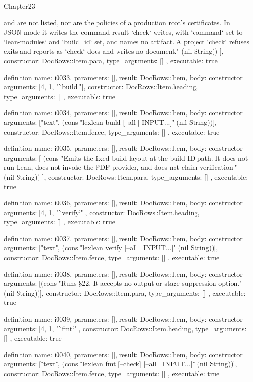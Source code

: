 \begin{lexlean}{Chapter23}
\begin{semanticmodule}
{{and are not listed, nor are the policies of a production root's certificates. In JSON mode it writes the command result `check` writes, with `command` set to `lean-modules` and `build_id` set, and names no artifact. A project `check` refuses exits and reports as `check` does and writes no document." (nil String))
    ],
    constructor: DocRows::Item.para,
    type_arguments: []
  },
  executable: true
}

definition{
  name: i0033,
  parameters: [],
  result: DocRows::Item,
  body: constructor{
    arguments: [4, 1, "`build`"],
    constructor: DocRows::Item.heading,
    type_arguments: []
  },
  executable: true
}

definition{
  name: i0034,
  parameters: [],
  result: DocRows::Item,
  body: constructor{
    arguments: ["text", (cons "lexlean build [--all | INPUT...]" (nil String))],
    constructor: DocRows::Item.fence,
    type_arguments: []
  },
  executable: true
}

definition{
  name: i0035,
  parameters: [],
  result: DocRows::Item,
  body: constructor{
    arguments: [
      (cons "Emits the fixed build layout at the build-ID path. It does not run Lean, does not invoke the PDF provider, and does not claim verification." (nil String))
    ],
    constructor: DocRows::Item.para,
    type_arguments: []
  },
  executable: true
}

definition{
  name: i0036,
  parameters: [],
  result: DocRows::Item,
  body: constructor{
    arguments: [4, 1, "`verify`"],
    constructor: DocRows::Item.heading,
    type_arguments: []
  },
  executable: true
}

definition{
  name: i0037,
  parameters: [],
  result: DocRows::Item,
  body: constructor{
    arguments: ["text", (cons "lexlean verify [--all | INPUT...]" (nil String))],
    constructor: DocRows::Item.fence,
    type_arguments: []
  },
  executable: true
}

definition{
  name: i0038,
  parameters: [],
  result: DocRows::Item,
  body: constructor{
    arguments: [(cons "Runs §22. It accepts no output or stage-suppression option." (nil String))],
    constructor: DocRows::Item.para,
    type_arguments: []
  },
  executable: true
}

definition{
  name: i0039,
  parameters: [],
  result: DocRows::Item,
  body: constructor{
    arguments: [4, 1, "`fmt`"],
    constructor: DocRows::Item.heading,
    type_arguments: []
  },
  executable: true
}

definition{
  name: i0040,
  parameters: [],
  result: DocRows::Item,
  body: constructor{
    arguments: ["text", (cons "lexlean fmt [--check] [--all | INPUT...]" (nil String))],
    constructor: DocRows::Item.fence,
    type_arguments: []
  },
  executable: true
}


\end{semanticmodule}
\end{lexlean}
